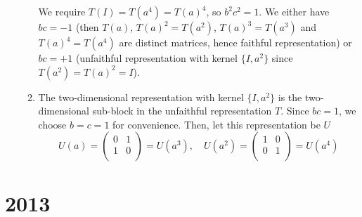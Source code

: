 \documentclass[a4paper]{article}
\begin{document}
\begin{ans}
\begin{enumerate}[label=(\roman*)]
\begin{enumerate}[label=(\alph*)]
We require $T(I)=T(a^4)=T(a)^4$, so $b^2c^2=1$. We either have $bc=-1$ (then $T(a)$, $T(a)^2=T(a^2)$, $T(a)^3=T(a^3)$ and $T(a)^4=T(a^4)$ are distinct matrices, hence faithful representation) or $bc=+1$ (unfaithful representation with kernel $\{I,a^2\}$ since $T(a^2)=T(a)^2=I$).
\item The two-dimensional representation with kernel $\{I,a^2\}$ is the two-dimensional sub-block in the unfaithful representation $T$. Since $bc=1$, we choose $b=c=1$ for convenience. Then, let this representation be $U$
$$U(a)=\begin{pmatrix}0&1\\1&0\\\end{pmatrix}=U(a^3),\quad U(a^2)=\begin{pmatrix}1&0\\0&1\\\end{pmatrix}=U(a^4)$$
\end{enumerate}
\end{enumerate}
\end{ans}
\newpage
\section{2013}
\end{document}
